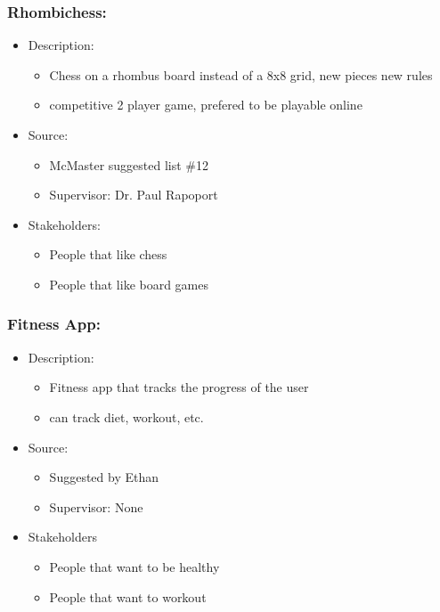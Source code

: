 \documentclass{article}
\begin{document}
\subsubsection*{Rhombichess:}
\label{subsec:chess}
\begin{itemize}
    \item Description:
    \begin{itemize}
        \item Chess on a rhombus board instead of a 8x8 grid, new pieces new rules
        \item competitive 2 player game, prefered to be playable online
    \end{itemize}
    \item Source:
    \begin{itemize}
        \item McMaster suggested list \#12
        \item Supervisor: Dr. Paul Rapoport
    \end{itemize}
    \item Stakeholders:
    \begin{itemize}
        \item People that like chess
        \item People that like board games
    \end{itemize}
\end{itemize}

\subsubsection*{Fitness App:}
\label{subsec:fitness}
\begin{itemize}
    \item Description:
    \begin{itemize}
        \item Fitness app that tracks the progress of the user
        \item can track diet, workout, etc.
    \end{itemize}
    \item Source:
    \begin{itemize}
        \item Suggested by Ethan
        \item Supervisor: None
    \end{itemize}
    \item Stakeholders
    \begin{itemize}
        \item People that want to be healthy
        \item People that want to workout
    \end{itemize}
\end{itemize}
\end{document}
